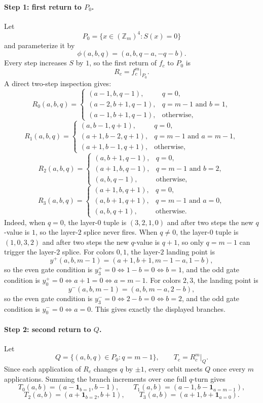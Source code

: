 \documentclass[11pt]{article}
\newcommand{\Zm}{\mathbb Z_m}
\newcommand{\I}{\mathbf 1}
\begin{document}
\paragraph{Step 1: first return to $P_0$.}
Let
\[
P_0=\{x\in (\Zm)^4:S(x)=0\}
\]
and parameterize it by
\[
\phi(a,b,q)=(a,b,q-a,-q-b).
\]
Every step increases $S$ by $1$, so the first return of $f_c$ to $P_0$ is
\[
R_c=f_c^m\big|_{P_0}.
\]
A direct two-step inspection gives:
\[
R_0(a,b,q)=
\begin{cases}
(a-1,b,q-1), & q=0,\\
(a-2,b+1,q-1), & q=m-1\text{ and }b=1,\\
(a-1,b+1,q-1), & \text{otherwise,}
\end{cases}
\]
\[
R_1(a,b,q)=
\begin{cases}
(a,b-1,q+1), & q=0,\\
(a+1,b-2,q+1), & q=m-1\text{ and }a=m-1,\\
(a+1,b-1,q+1), & \text{otherwise,}
\end{cases}
\]
\[
R_2(a,b,q)=
\begin{cases}
(a,b+1,q-1), & q=0,\\
(a+1,b,q-1), & q=m-1\text{ and }b=2,\\
(a,b,q-1), & \text{otherwise,}
\end{cases}
\]
\[
R_3(a,b,q)=
\begin{cases}
(a+1,b,q+1), & q=0,\\
(a,b+1,q+1), & q=m-1\text{ and }a=0,\\
(a,b,q+1), & \text{otherwise.}
\end{cases}
\]
Indeed, when $q=0$, the layer-$0$ tuple is $(3,2,1,0)$ and after two steps the new $q$-value is $1$, so the layer-$2$ splice never fires. When $q\ne 0$, the layer-$0$ tuple is $(1,0,3,2)$ and after two steps the new $q$-value is $q+1$, so only $q=m-1$ can trigger the layer-$2$ splice. For colors $0,1$, the layer-$2$ landing point is
\[
y^+(a,b,m-1)=(a+1,b+1,m-1-a,1-b),
\]
so the even gate condition is $y^+_3=0\iff 1-b=0\iff b=1$, and the odd gate condition is $y^+_0=0\iff a+1=0\iff a=m-1$. For colors $2,3$, the landing point is
\[
y^-(a,b,m-1)=(a,b,m-a,2-b),
\]
so the even gate condition is $y^-_3=0\iff 2-b=0\iff b=2$, and the odd gate condition is $y^-_0=0\iff a=0$. This gives exactly the displayed branches.

\paragraph{Step 2: second return to $Q$.}
Let
\[
Q=\{(a,b,q)\in P_0:q=m-1\},
\qquad
T_c=R_c^m\big|_Q.
\]
Since each application of $R_c$ changes $q$ by $\pm1$, every orbit meets $Q$ once every $m$ applications. Summing the branch increments over one full $q$-turn gives
\[
T_0(a,b)=(a-\I_{b=1},b-1),
\qquad
T_1(a,b)=(a-1,b-\I_{a=m-1}),
\]
\[
T_2(a,b)=(a+\I_{b=2},b+1),
\qquad
T_3(a,b)=(a+1,b+\I_{a=0}).
\]
\end{document}
